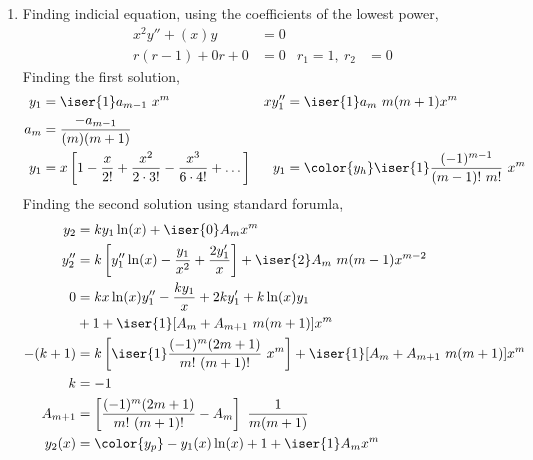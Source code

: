 \begin{enumerate}
    \item Finding indicial equation, using the coefficients of the lowest power,
          \begin{align}
              x^2 y'' + (x) y   & = 0   \\
              r(r - 1) + 0r + 0 & = 0 &
              r_1 = 1,\ r_2     & = 0
          \end{align}
          Finding the first solution,
          \begin{align}
              y_1            & = \iser{1} a_{m-1}\ x^{m}      &
              xy_1''         & = \iser{1} a_{m}\ m(m+1) x^{m}   \\
              a_{m}          & = \frac{-a_{m-1}}{(m)(m+1)}      \\
              y_1            & = x\left[ 1 - \frac{x}{2!}
                  + \frac{x^2}{2 \cdot 3!} - \frac{x^3}{6 \cdot 4!}
              + \dots\right] &
              y_1            & = \color{y_h}  \iser{1}
              \frac{(-1)^{m-1}}{(m-1)!\ m!}\ x^{m}
          \end{align}
          Finding the second solution using standard forumla,
          \begin{align}
              y_2     & = ky_1\ln(x) + \iser{0}A_m x^m                            \\
              y_2''   & = k\left[y_1'' \ln(x) - \frac{y_1}{x^2}
              + \frac{2y_1'}{x}\right] + \iser{2} A_m\ m(m-1) x^{m-2}             \\
              0       & = kx \ln(x) y_1'' - \frac{ky_1}{x} + 2ky_1' + k\ln(x) y_1 \\
                      & + 1 + \iser{1}[A_m + A_{m+1}\ m(m+1)] x^m                 \\
              -(k+1)  & = k \left[\iser{1}\frac{(-1)^m (2m + 1)}
                  {m!\ (m+1)!}\ x^m\right]
              + \iser{1}[A_m + A_{m+1}\ m(m+1)] x^m                               \\
              k       & = -1                                                      \\
              A_{m+1} & = \left[ \frac{(-1)^{m} (2m+1)}{m!\ (m+1)!} - A_m \right]
              \ \frac{1}{m(m+1)}                                                  \\
              y_2(x)  & = {\color{y_p}-y_1(x)\ln(x) + 1
              + \iser{1} A_m x^m}
          \end{align}


\end{enumerate}
